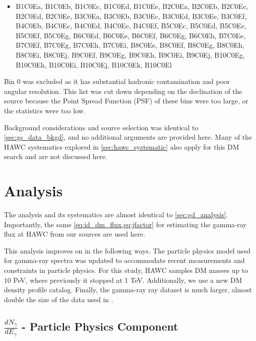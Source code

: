 \begin{itemize}
    \item[] B1C0Ea, B1C0Eb, B1C0Ec, B1C0Ed, B1C0Ee, B2C0Ea, B2C0Eb, B2C0Ec, B2C0Ed, B2C0Ee, B3C0Ea, B3C0Eb, B3C0Ec, B3C0Ed, B3C0Ee, B3C0Ef, B4C0Eb, B4C0Ec, B4C0Ed, B4C0Ee, B4C0Ef, B5C0Ec, B5C0Ed, B5C0Ee, B5C0Ef, B5C0Eg, B6C0Ed, B6C0Ee, B6C0Ef, B6C0Eg, B6C0Eh, B7C0Ee, B7C0Ef, B7C0Eg, B7C0Eh, B7C0Ei, B8C0Ee, B8C0Ef, B8C0Eg, B8C0Eh, B8C0Ei, B8C0Ej, B9C0Ef, B9C0Eg, B9C0Eh, B9C0Ei, B9C0Ej, B10C0Eg, B10C0Eh, B10C0Ei, B10C0Ej, B10C0Ek, B10C0El
\end{itemize}
Bin 0 was excluded as it has substantial hadronic contamination and poor angular resolution.
This list was cut down depending on the declination of the source because the Point Spread Function (PSF) of these bins were too large, or the statistics were too low.

Background considerations and source selection was identical to \cref{sec:gs_data_bkgd}, and no additional arguments are provided here.
Many of the HAWC systematics explored in \cref{sec:hawc_systematic} also apply for this DM search and are not discussed here.

\section{Analysis}\label{sec:mtd_analysis}

The analysis and its systematics are almost identical to \cref{sec:gd_analysis}.
Importantly, the same \cref{eq:id_dm_flux,eq:jfactor} for estimating the gamma-ray flux at HAWC from our sources are used here.

This analysis improves on  in the following ways.
The particle physics model used for gamma-ray spectra was updated to accommodate recent measurements and constraints in particle physics.
For this study, HAWC samples DM masses up to $10$ PeV, where previously it stopped at 1 TeV.
Additionally, we use a new DM density profile catalog.
Finally, the gamma-ray ray dataset is much larger, almost double the size of the data used in .

\subsection{$\frac{dN_\gamma}{dE_\gamma}$ - Particle Physics Component}\label{sec:mtd_particlephysics}

